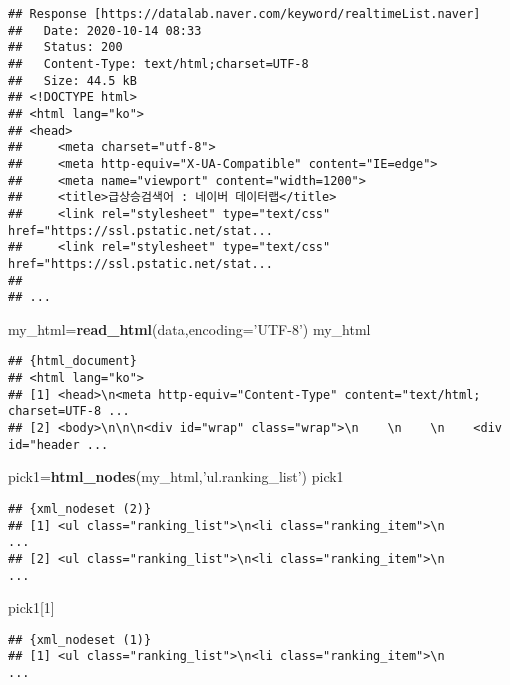 \documentclass[
]{article}
\newenvironment{Shaded}{\begin{snugshade}}{\end{snugshade}}
\newcommand{\DataTypeTok}[1]{\textcolor[rgb]{0.13,0.29,0.53}{#1}}
\newcommand{\DecValTok}[1]{\textcolor[rgb]{0.00,0.00,0.81}{#1}}
\newcommand{\KeywordTok}[1]{\textcolor[rgb]{0.13,0.29,0.53}{\textbf{#1}}}
\newcommand{\NormalTok}[1]{#1}
\newcommand{\StringTok}[1]{\textcolor[rgb]{0.31,0.60,0.02}{#1}}
\begin{document}
\begin{verbatim}
## Response [https://datalab.naver.com/keyword/realtimeList.naver]
##   Date: 2020-10-14 08:33
##   Status: 200
##   Content-Type: text/html;charset=UTF-8
##   Size: 44.5 kB
## <!DOCTYPE html>
## <html lang="ko">
## <head>
##     <meta charset="utf-8">
##     <meta http-equiv="X-UA-Compatible" content="IE=edge">
##     <meta name="viewport" content="width=1200">
##     <title>급상승검색어 : 네이버 데이터랩</title>
##     <link rel="stylesheet" type="text/css" href="https://ssl.pstatic.net/stat...
##     <link rel="stylesheet" type="text/css" href="https://ssl.pstatic.net/stat...
## 
## ...
\end{verbatim}

\begin{Shaded}
\begin{Highlighting}[]
\NormalTok{my_html=}\KeywordTok{read_html}\NormalTok{(data,}\DataTypeTok{encoding=}\StringTok{'UTF-8'}\NormalTok{)}
\NormalTok{my_html}
\end{Highlighting}
\end{Shaded}

\begin{verbatim}
## {html_document}
## <html lang="ko">
## [1] <head>\n<meta http-equiv="Content-Type" content="text/html; charset=UTF-8 ...
## [2] <body>\n\n\n<div id="wrap" class="wrap">\n    \n    \n    <div id="header ...
\end{verbatim}

\begin{Shaded}
\begin{Highlighting}[]
\NormalTok{pick1=}\KeywordTok{html_nodes}\NormalTok{(my_html,}\StringTok{'ul.ranking_list'}\NormalTok{)}
\NormalTok{pick1}
\end{Highlighting}
\end{Shaded}

\begin{verbatim}
## {xml_nodeset (2)}
## [1] <ul class="ranking_list">\n<li class="ranking_item">\n                    ...
## [2] <ul class="ranking_list">\n<li class="ranking_item">\n                    ...
\end{verbatim}

\begin{Shaded}
\begin{Highlighting}[]
\NormalTok{pick1[}\DecValTok{1}\NormalTok{]}
\end{Highlighting}
\end{Shaded}

\begin{verbatim}
## {xml_nodeset (1)}
## [1] <ul class="ranking_list">\n<li class="ranking_item">\n                    ...
\end{verbatim}
\end{document}
